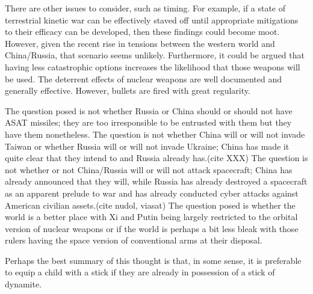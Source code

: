 There are other issues to consider, such as timing.  For example, if a
state of terrestrial kinetic war can be effectively staved off until
appropriate mitigations to their efficacy can be developed, then these
findings could become moot.  However, given the recent rise in
tensions between the western world and China/Russia, that scenario
seems unlikely.  Furthermore, it could be argued that having less
catastrophic options increases the likelihood that those weapons will
be used.  The deterrent effects of nuclear weapons are well documented
and generally effective.\cite[mad]{xxx} However, bullets are fired
with great regularity.

The question posed is not whether Russia or China should or should not
have ASAT missiles; they are too irresponsible to be entrusted with
them but they have them nonetheless.  The question is not whether
China will or will not invade Taiwan or whether Russia will or will
not invade Ukraine; China has made it quite clear that they intend to
and Russia already has.(cite XXX) The question is not whether or not
China/Russia will or will not attack spacecraft; China has already
announced that they will, while Russia has already destroyed a
spacecraft as an apparent prelude to war and has already conducted
cyber attacks against American civilian assets.(cite nudol, viasat)
The question posed is whether the world is a better place with Xi and
Putin being largely restricted to the orbital version of nuclear
weapons or if the world is perhaps a bit less bleak with those rulers
having the space version of conventional arms at their disposal.

Perhaps the best summary of this thought is that, in some sense, it is
preferable to equip a child with a stick if they are already in
possession of a stick of dynamite.


